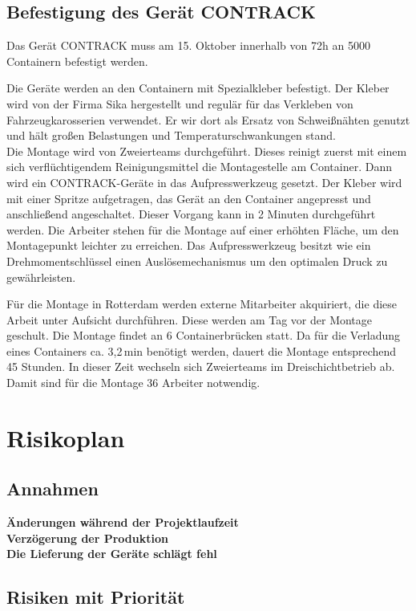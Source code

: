 \subsection{Befestigung des Gerät CONTRACK}
Das Gerät CONTRACK muss am 15. Oktober innerhalb von 72h an 5000 Containern befestigt werden.

Die Geräte werden an den Containern mit Spezialkleber befestigt. Der Kleber wird von der Firma Sika hergestellt und regulär für das Verkleben von Fahrzeugkarosserien verwendet. Er wir dort als Ersatz von Schweißnähten genutzt und hält großen Belastungen und Temperaturschwankungen stand.\\
Die Montage wird von Zweierteams durchgeführt. Dieses reinigt zuerst mit einem sich verflüchtigendem Reinigungsmittel die Montagestelle am Container. Dann wird ein CONTRACK-Geräte in das Aufpresswerkzeug gesetzt. Der Kleber wird mit einer Spritze aufgetragen, das Gerät an den Container angepresst und anschließend angeschaltet. Dieser Vorgang kann in 2 Minuten durchgeführt werden. Die Arbeiter stehen für die Montage auf einer erhöhten Fläche, um den Montagepunkt leichter zu erreichen. Das Aufpresswerkzeug besitzt wie ein Drehmomentschlüssel einen Auslösemechanismus um den optimalen Druck zu gewährleisten.

Für die Montage in Rotterdam werden externe Mitarbeiter akquiriert, die diese Arbeit unter Aufsicht durchführen. Diese werden am Tag vor der Montage geschult. Die Montage findet an 6 Containerbrücken statt. Da für die Verladung eines Containers ca. 3,2\,min benötigt werden, dauert die Montage entsprechend 45 Stunden. In dieser Zeit wechseln sich Zweierteams im Dreischichtbetrieb ab. Damit sind für die Montage 36 Arbeiter notwendig.


\section{Risikoplan}
\subsection{Annahmen} %

\textbf{Änderungen während der Projektlaufzeit}\\
\textbf{Verzögerung der Produktion}\\
\textbf{Die Lieferung der Geräte schlägt fehl}

\subsection{Risiken mit Priorität} %

